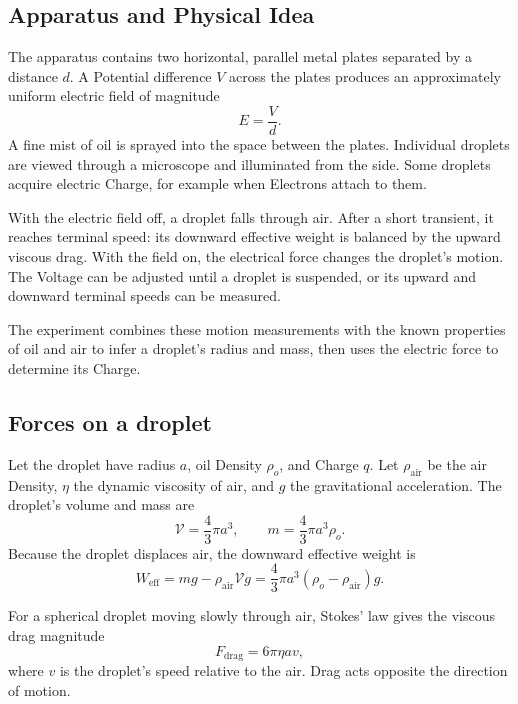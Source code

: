 \documentclass[a4paper, 10pt, onepage]{elegantbook}
\begin{document}
{\subsection{Apparatus and Physical Idea}

The apparatus contains two horizontal, parallel metal plates separated
by a distance \(d\). A Potential difference \(V\) across the plates
produces an approximately uniform electric field of magnitude
\begin{equation}
E=\frac{V}{d}.
\label{eq:field}
\end{equation}
A fine mist of oil is sprayed into the space between the plates.
Individual droplets are viewed through a microscope and illuminated
from the side. Some droplets acquire electric Charge, for example
when Electrons attach to them.

With the electric field off, a droplet falls through air. After a
short transient, it reaches terminal speed: its downward effective
weight is balanced by the upward viscous drag. With the field on, the
electrical force changes the droplet's motion. The Voltage can be
adjusted until a droplet is suspended, or its upward and downward
terminal speeds can be measured.

The experiment combines these motion measurements with the known
properties of oil and air to infer a droplet's radius and mass, then
uses the electric force to determine its Charge.

\subsection{Forces on a droplet}

Let the droplet have radius \(a\), oil Density \(\rho_o\), and Charge
\(q\). Let \(\rho_{\mathrm{air}}\) be the air Density, \(\eta\) the
dynamic viscosity of air, and \(g\) the gravitational acceleration.
The droplet's volume and mass are
\begin{equation}
\mathcal V=\frac{4}{3}\pi a^3,
\qquad
m=\frac{4}{3}\pi a^3\rho_o.
\end{equation}
Because the droplet displaces air, the downward effective weight is
\begin{equation}
W_{\mathrm{eff}}
=mg-\rho_{\mathrm{air}}\mathcal V g
=\frac{4}{3}\pi a^3
(\rho_o-\rho_{\mathrm{air}})g.
\label{eq:effective-weight}
\end{equation}

For a spherical droplet moving slowly through air, Stokes' law gives
the viscous drag magnitude
\begin{equation}
F_{\mathrm{drag}}=6\pi\eta a v,
\label{eq:stokes}
\end{equation}
where \(v\) is the droplet's speed relative to the air. Drag acts
opposite the direction of motion.

}
\end{document}
